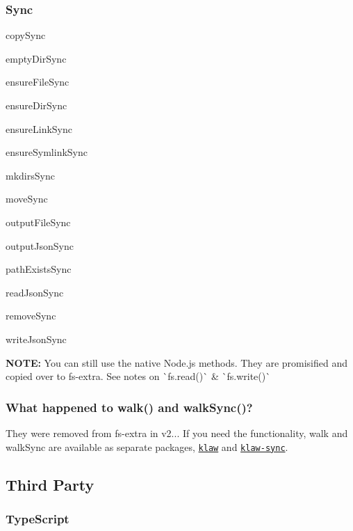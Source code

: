 \subsubsection*{Sync}


\begin{DoxyItemize}
\item copy\+Sync
\item empty\+Dir\+Sync
\item ensure\+File\+Sync
\item ensure\+Dir\+Sync
\item ensure\+Link\+Sync
\item ensure\+Symlink\+Sync
\item mkdirs\+Sync
\item move\+Sync
\item output\+File\+Sync
\item output\+Json\+Sync
\item path\+Exists\+Sync
\item read\+Json\+Sync
\item remove\+Sync
\item write\+Json\+Sync
\end{DoxyItemize}

{\bfseries N\+O\+TE\+:} You can still use the native Node.\+js methods. They are promisified and copied over to {\ttfamily fs-\/extra}. See notes on \`{}fs.read()\`{} \& \`{}fs.write()\`{}

\subsubsection*{What happened to {\ttfamily walk()} and {\ttfamily walk\+Sync()}?}

They were removed from {\ttfamily fs-\/extra} in v2... If you need the functionality, {\ttfamily walk} and {\ttfamily walk\+Sync} are available as separate packages, \href{https://github.com/jprichardson/node-klaw}{\tt {\ttfamily klaw}} and \href{https://github.com/manidlou/node-klaw-sync}{\tt {\ttfamily klaw-\/sync}}.

\subsection*{Third Party }

\subsubsection*{Type\+Script}

